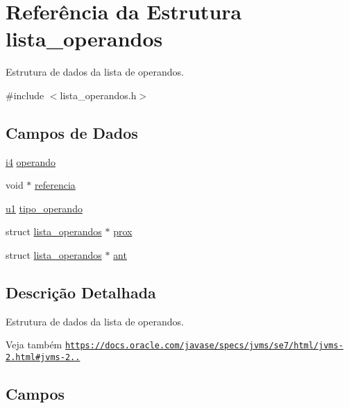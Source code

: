 \hypertarget{structlista__operandos}{}\section{Referência da Estrutura lista\+\_\+operandos}
\label{structlista__operandos}


Estrutura de dados da lista de operandos.  




{\ttfamily \#include $<$lista\+\_\+operandos.\+h$>$}

\subsection*{Campos de Dados}
\begin{DoxyCompactItemize}
\item 
\hyperlink{lista__operandos_8h_a7bc084923d20fddbe46335d882c6fda2}{i4} \hyperlink{structlista__operandos_ab978dbacb8f42fd87f19cca8e804d121}{operando}
\item 
void $\ast$ \hyperlink{structlista__operandos_a5efba56f9f00715a8c9558292b851d37}{referencia}
\item 
\hyperlink{lista__operandos_8h_ad9f4cdb6757615aae2fad89dab3c5470}{u1} \hyperlink{structlista__operandos_af64bc84846f21a809f68b783f0e39f40}{tipo\+\_\+operando}
\item 
struct \hyperlink{structlista__operandos}{lista\+\_\+operandos} $\ast$ \hyperlink{structlista__operandos_a90699e5c7f710177b37754cd5231c9f5}{prox}
\item 
struct \hyperlink{structlista__operandos}{lista\+\_\+operandos} $\ast$ \hyperlink{structlista__operandos_a23159c6dfeb873d67e8d51c312c551ee}{ant}
\end{DoxyCompactItemize}


\subsection{Descrição Detalhada}
Estrutura de dados da lista de operandos. 

\begin{DoxySeeAlso}{Veja também}
\href{https://docs.oracle.com/javase/specs/jvms/se7/html/jvms-2.html#jvms-2.6.2}{\tt https\+://docs.\+oracle.\+com/javase/specs/jvms/se7/html/jvms-\/2.\+html\#jvms-\/2..} 
\end{DoxySeeAlso}


\subsection{Campos}
